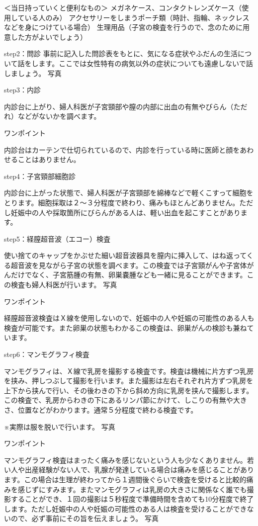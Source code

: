 ＜当日持っていくと便利なもの＞
メガネケース、コンタクトレンズケース（使用している人のみ）
アクセサリーをしまうポーチ類（時計、指輪、ネックレスなどを身につけている場合）
生理用品（子宮の検査を行うので、念のために用意した方がよいでしょう）

step2：問診
事前に記入した問診表をもとに、気になる症状やふだんの生活について話をします。ここでは女性特有の病気以外の症状についても遠慮しないで話しましょう。 	  	写真

step3：内診

内診台に上がり、婦人科医が子宮頸部や膣の内部に出血の有無やびらん（ただれ）などがないかを調べます。

ワンポイント

内診台はカーテンで仕切られているので、内診を行っている時に医師と顔をあわせることはありません。

step4：子宮頸部細胞診

内診台に上がった状態で、婦人科医が子宮頸部を綿棒などで軽くこすって細胞をとります。細胞採取は２～３分程度で終わり、痛みもほとんどありません。ただし妊娠中の人や採取箇所にびらんがある人は、軽い出血を起こすことがあります。

step5：経膣超音波（エコー）検査

使い捨てのキャップをかぶせた細い超音波器具を膣内に挿入して、はね返ってくる超音波を見ながら子宮の状態を調べます。この検査では子宮頸がんや子宮体がんだけでなく、子宮筋腫の有無、卵巣嚢腫なども一緒に見ることができます。この検査も婦人科医が行います。
	  	写真

ワンポイント

経膣超音波検査はＸ線を使用しないので、妊娠中の人や妊娠の可能性のある人も検査が可能です。また卵巣の状態もわかるこの検査は、卵巣がんの検診も兼ねています。

step6：マンモグラフィ検査

マンモグラフィは、Ｘ線で乳房を撮影する検査です。検査は機械に片方ずつ乳房を挟み、押しつぶして撮影を行います。また撮影は左右それぞれ片方ずつ乳房を上下から挟んで行い、その後わきの下から斜め方向に乳房を挟んで撮影します。この検査で、乳房からわきの下にあるリンパ節にかけて、しこりの有無や大きさ、位置などがわかります。通常５分程度で終わる検査です。

※実際は服を脱いで行います。
	  	写真

ワンポイント

マンモグラフィ検査はまったく痛みを感じないという人も少なくありません。若い人や出産経験がない人で、乳腺が発達している場合は痛みを感じることがあります。この場合は生理が終わってから１週間後ぐらいで検査を受けると比較的痛みを感じずにすみます。またマンモグラフィは乳房の大きさに関係なく誰でも撮影することができ、１回の撮影は５秒程度で準備時間を含めても10分程度で終了します。ただし妊娠中の人や妊娠の可能性のある人は検査を受けることができないので、必ず事前にその旨を伝えましょう。
	  	写真

